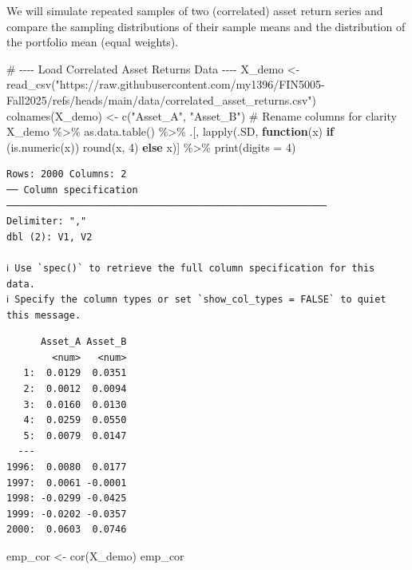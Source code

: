 \documentclass[
  12pt,
  letterpaper,
]{scrbook}
\newenvironment{Shaded}{\begin{snugshade}}{\end{snugshade}}
\newcommand{\AttributeTok}[1]{\textcolor[rgb]{0.40,0.45,0.13}{#1}}
\newcommand{\CommentTok}[1]{\textcolor[rgb]{0.37,0.37,0.37}{#1}}
\newcommand{\ControlFlowTok}[1]{\textcolor[rgb]{0.00,0.23,0.31}{\textbf{#1}}}
\newcommand{\DecValTok}[1]{\textcolor[rgb]{0.68,0.00,0.00}{#1}}
\newcommand{\FunctionTok}[1]{\textcolor[rgb]{0.28,0.35,0.67}{#1}}
\newcommand{\NormalTok}[1]{\textcolor[rgb]{0.00,0.23,0.31}{#1}}
\newcommand{\OtherTok}[1]{\textcolor[rgb]{0.00,0.23,0.31}{#1}}
\newcommand{\SpecialCharTok}[1]{\textcolor[rgb]{0.37,0.37,0.37}{#1}}
\newcommand{\StringTok}[1]{\textcolor[rgb]{0.13,0.47,0.30}{#1}}
\theoremstyle{definition}
\theoremstyle{plain}
\theoremstyle{remark}
\begin{document}
We will simulate repeated samples of two (correlated) asset return
series and compare the sampling distributions of their sample means and
the distribution of the portfolio mean (equal weights).

\begin{Shaded}
\begin{Highlighting}[]
\CommentTok{\# {-}{-}{-}{-} Load Correlated Asset Returns Data {-}{-}{-}{-}}
\NormalTok{X\_demo }\OtherTok{\textless{}{-}} \FunctionTok{read\_csv}\NormalTok{(}\StringTok{"https://raw.githubusercontent.com/my1396/FIN5005{-}Fall2025/refs/heads/main/data/correlated\_asset\_returns.csv"}\NormalTok{)}
\FunctionTok{colnames}\NormalTok{(X\_demo) }\OtherTok{\textless{}{-}} \FunctionTok{c}\NormalTok{(}\StringTok{"Asset\_A"}\NormalTok{, }\StringTok{"Asset\_B"}\NormalTok{)  }\CommentTok{\# Rename columns for clarity}
\NormalTok{X\_demo }\SpecialCharTok{\%\textgreater{}\%}
    \FunctionTok{as.data.table}\NormalTok{() }\SpecialCharTok{\%\textgreater{}\%}
\NormalTok{    .[, }\FunctionTok{lapply}\NormalTok{(.SD, }\ControlFlowTok{function}\NormalTok{(x) }\ControlFlowTok{if}\NormalTok{ (}\FunctionTok{is.numeric}\NormalTok{(x)) }\FunctionTok{round}\NormalTok{(x, }\DecValTok{4}\NormalTok{) }\ControlFlowTok{else}\NormalTok{ x)] }\SpecialCharTok{\%\textgreater{}\%}
    \FunctionTok{print}\NormalTok{(}\AttributeTok{digits =} \DecValTok{4}\NormalTok{)}
\end{Highlighting}
\end{Shaded}

\begin{verbatim}
Rows: 2000 Columns: 2
── Column specification ────────────────────────────────────────────────────────
Delimiter: ","
dbl (2): V1, V2

ℹ Use `spec()` to retrieve the full column specification for this data.
ℹ Specify the column types or set `show_col_types = FALSE` to quiet this message.
\end{verbatim}

\begin{verbatim}
      Asset_A Asset_B
        <num>   <num>
   1:  0.0129  0.0351
   2:  0.0012  0.0094
   3:  0.0160  0.0130
   4:  0.0259  0.0550
   5:  0.0079  0.0147
  ---                
1996:  0.0080  0.0177
1997:  0.0061 -0.0001
1998: -0.0299 -0.0425
1999: -0.0202 -0.0357
2000:  0.0603  0.0746
\end{verbatim}

\begin{Shaded}
\begin{Highlighting}[]
\NormalTok{emp\_cor }\OtherTok{\textless{}{-}} \FunctionTok{cor}\NormalTok{(X\_demo)}
\NormalTok{emp\_cor}
\end{Highlighting}
\end{Shaded}
\end{document}
